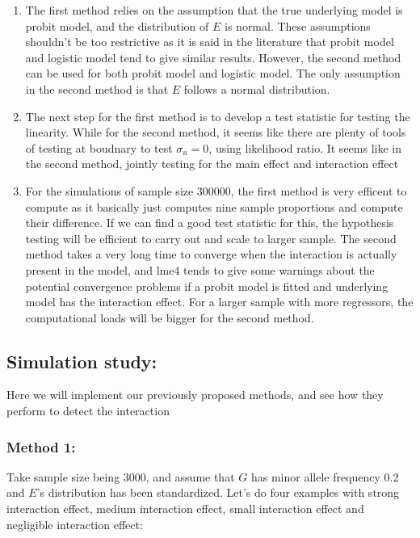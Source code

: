 \documentclass[]{article}
\begin{document}
\begin{enumerate}
\item The first method relies on the assumption that the true underlying model is probit model, and the distribution of $E$ is normal. These assumptions shouldn't be too restrictive as it is said in the literature that probit model and logistic model tend to give similar results. However, the second method can be used for both probit model and logistic model. The only assumption in the second method is that $E$ follows a normal distribution.
\item The next step for the first method is to develop a test statistic for testing the linearity. While for the second method, it seems like there are plenty of tools of testing at boudnary to test $\sigma_u = 0$, using likelihood ratio. It seems like in the second method, jointly testing for the main effect and interaction effect 
\item For the simulations of sample size 300000, the first method is very efficent to compute as it basically just computes nine sample proportions and compute their difference. If we can find a good test statistic for this, the hypothesis testing will be efficient to carry out and scale to larger sample. The second method takes a very long time to converge when the interaction is actually present in the model, and lme4 tends to give some warnings about the potential convergence problems if a probit model is fitted and underlying model has the interaction effect. For a larger sample with more regressors, the computational loads will be bigger for the second method.

\end{enumerate}

\hypertarget{simulation-study}{%
\subsection{Simulation study:}\label{simulation-study}}

Here we will implement our previously proposed methods, and see how they
perform to detect the interaction

\hypertarget{method-1}{%
\subsubsection{Method 1:}\label{method-1}}

Take sample size being 3000, and assume that \(G\) has minor allele
frequency 0.2 and \(E\)'s distribution has been standardized. Let's do
four examples with strong interaction effect, medium interaction effect,
small interaction effect and negligible interaction effect:
\end{document}
